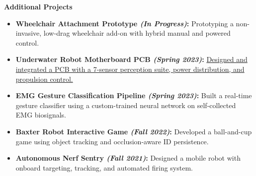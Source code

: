 \documentclass[letterpaper,10pt]{article}
\newcommand{\experience}[5]{%
    \noindent\textbf{#1}%
    \ifx&#2&
    \else
        , \textit{#2}%
    \fi
    \ifx&#3&
    \else
        , #3%
    \fi
    \hfill \textit{#4} \\
    \vspace{-6.8mm}%
    \begin{itemize}[itemsep=-5pt]
        \setlength{\itemindent}{0em}
        #5
    \end{itemize}
    \vspace{1mm}
}
\begin{document}

{\Large \noindent\textbf{Additional Projects}} \\
\vspace{-1em}
\begin{itemize}
    \item \textbf{Wheelchair Attachment Prototype \textit{(In Progress)}:} Prototyping a non-invasive, low-drag wheelchair add-on with hybrid manual and powered control.
    
    \item \textbf{Underwater Robot Motherboard PCB \textit{(Spring 2023)}:} \href{https://ryanbarry.me/projects/electrical-engineering/underwater-robot/}{Designed and integrated a PCB with a 7-sensor perception suite, power distribution, and propulsion control.}
    
    \item \textbf{EMG Gesture Classification Pipeline \textit{(Spring 2023)}:} Built a real-time gesture classifier using a custom-trained neural network on self-collected EMG biosignals.
    
    \item \textbf{Baxter Robot Interactive Game \textit{(Fall 2022)}:} Developed a ball-and-cup game using object tracking and occlusion-aware ID persistence.
    
    \item \textbf{Autonomous Nerf Sentry \textit{(Fall 2021)}:} Designed a mobile robot with onboard targeting, tracking, and automated firing system.
\end{itemize}
\end{document}
